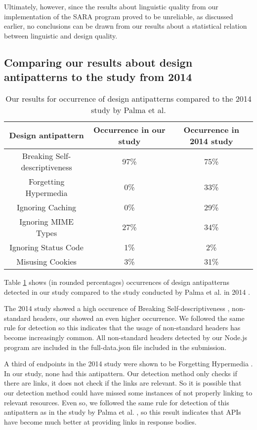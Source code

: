 Ultimately, however, since the results about linguistic quality from our implementation of the SARA program proved to be unreliable, as discussed earlier, no conclusions can be drawn from our results about a statistical relation between linguistic and design quality. 

\subsection{Comparing our results about design antipatterns to the study from 2014}

\begin{table}[htb!]
    \centering
    \begin{tabular}{|c|c|c|} \hline
    Design antipattern & Occurrence in our study & Occurrence in 2014 study  \\ \hline
    Breaking Self-descriptiveness & 97\% & 75\%  \\ \hline
    Forgetting Hypermedia & 0\% & 33\%  \\ \hline
    Ignoring Caching & 0\% & 29\%   \\ \hline
    Ignoring MIME Types & 27\% & 34\%  \\ \hline
    Ignoring Status Code & 1\% & 2\%  \\ \hline
    Misusing Cookies & 3\% & 31\%  \\ \hline
    \end{tabular}
    \caption{Our results for occurrence of design antipatterns compared to the 2014 study by Palma et al. \cite{design}}
    \label{tab:design antipatterns compared to the 2014 study}
\end{table}

Table \ref{tab:design antipatterns compared to the 2014 study} shows (in rounded percentages) occurrences of design antipatterns detected in our study compared to the study conducted by Palma et al. in 2014 \cite{design}. 

The 2014 study showed a high occurence of Breaking Self-descriptiveness \cite{design}, non-standard headers, our showed an even higher occurrence. We followed the same rule for detection so this indicates that the usage of non-standard headers has become increasingly common. All non-standard headers detected by our Node.js program are included in the full-data.json file included in the submission. 

A third of endpoints in the 2014 study were shown to be Forgetting Hypermedia \cite{design}. In our study, none had this antipattern. Our detection method only checks if there are links, it does not check if the links are relevant. So it is possible that our detection method could have missed some instances of not properly linking to relevant resources. Even so, we followed the same rule for detection of this antipattern as in the study by Palma et al. \cite{design}, so this result indicates that APIs have become much better at providing links in response bodies.

